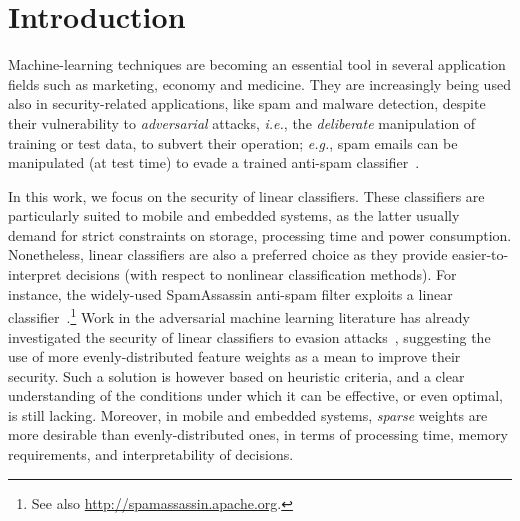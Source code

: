 \documentclass[runningheads,a4paper]{llncs}
\newcommand{\ie}{\emph{i.e.}}
\newcommand{\eg}{\emph{e.g.}}
\begin{document}
\section{Introduction}
\label{sect:introduction}

Machine-learning techniques are becoming an essential tool in several application fields such as marketing, economy and medicine.
They are increasingly being used also in security-related applications, like spam and malware detection, despite their vulnerability to \emph{adversarial} attacks, \ie, the \emph{deliberate} manipulation of training or test data, to subvert their operation; \eg, spam emails can be manipulated (at test time) to evade a trained anti-spam classifier~\cite{dalvi04,lowd05,lowd05-ceas,kolcz09,nelson08,barreno06-asiaccs,biggio10-ijmlc,biggio13-ecml,biggio14-tkde,biggio14-ijprai,huang11,zhang16-tcyb}. 

In this work, we focus on the security of linear classifiers. These classifiers are particularly suited to mobile and embedded systems, as the latter usually demand for strict constraints on storage, processing time and power consumption. Nonetheless, linear classifiers are also a preferred choice as they provide easier-to-interpret decisions (with respect to nonlinear classification methods).
For instance, the widely-used SpamAssassin anti-spam filter exploits a linear classifier~\cite{biggio10-ijmlc,nelson08}.\footnote{See also \url{http://spamassassin.apache.org}.}
Work in the adversarial machine learning literature has already investigated the security of linear classifiers to evasion attacks~\cite{kolcz09,biggio10-ijmlc}, suggesting the use of more evenly-distributed feature weights as a mean to improve their security. Such a solution is however based on heuristic criteria, and a clear understanding of the conditions under which it can be effective, or even optimal, is still lacking. 
Moreover, in mobile and embedded systems, \emph{sparse} weights are more desirable than evenly-distributed ones, in terms of processing time, memory requirements, and interpretability of decisions.
\end{document}
